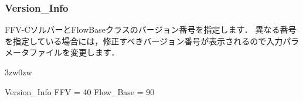 \pagebreak
\subsubsection{Version\_Info}

FFV-CソルバーとFlowBaseクラスの\hypertarget{tgt:version}{バージョン番号}を指定します．
異なる番号を指定している場合には，修正すべきバージョン番号が表示されるので入力パラメータファイルを変更します．

\begin{indentation}{3zw}{0zw}
\small
\begin{program}
  Version_Info {
    FFV       = 40
    Flow_Base = 90
  }
\end{program}

\end{indentation}

